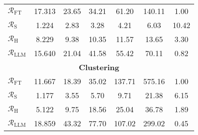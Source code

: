 \begin{table}[t]
\begin{tabular}{lcccccc}
$\mathcal{R}_\text{FT}$ & 17.313 & 23.65 & 34.21 & 61.20 & 140.11 & 1.00 \\ %
$\mathcal{R}_\text{S}$ & 1.224 & 2.83 & 3.28 & 4.21 & 6.03 & 10.42 \\ %
$\mathcal{R}_\text{H}$ & 8.229 & 9.38 & 10.35 & 11.57 & 13.65 & 3.30 \\ %
$\mathcal{R}_\text{LLM}$ & 15.640 & 21.04 & 41.58 & 55.42 & 70.11 & 0.82 \\ %
\multicolumn{7}{c}{\textbf{Clustering}} \\  %
$\mathcal{R}_\text{FT}$ & 11.667 & 18.39 & 35.02 & 137.71 & 575.16 & 1.00 \\ %
$\mathcal{R}_\text{S}$ & 1.177 & 3.55 & 5.70 & 9.71 & 21.38 & 6.15 \\ %
$\mathcal{R}_\text{H}$ & 5.122 & 9.75 & 18.56 & 25.04 & 36.78 & 1.89 \\ %
$\mathcal{R}_\text{LLM}$ & 18.859 & 43.32 & 77.70 & 107.02 & 299.02 & 0.45 \\ %
\bottomrule
\end{tabular}
\vspace{-2mm} %
\end{table}
